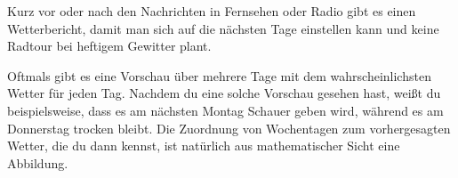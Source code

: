 \documentclass[../../main.tex]{subfiles}
\begin{document}
\begin{example}
    Kurz vor oder nach den Nachrichten in Fernsehen oder Radio gibt es einen Wetterbericht, damit man sich auf die nächsten Tage einstellen kann und keine Radtour bei heftigem Gewitter plant.
    
    Oftmals gibt es eine Vorschau über mehrere Tage mit dem wahrscheinlichsten Wetter für jeden Tag. Nachdem du eine solche Vorschau gesehen hast, weißt du beispielsweise, dass es am nächsten Montag Schauer geben wird, während es am Donnerstag trocken bleibt. Die Zuordnung von Wochentagen zum vorhergesagten Wetter, die du dann kennst, ist natürlich aus mathematischer Sicht eine Abbildung.
    

\end{example}
\end{document}
